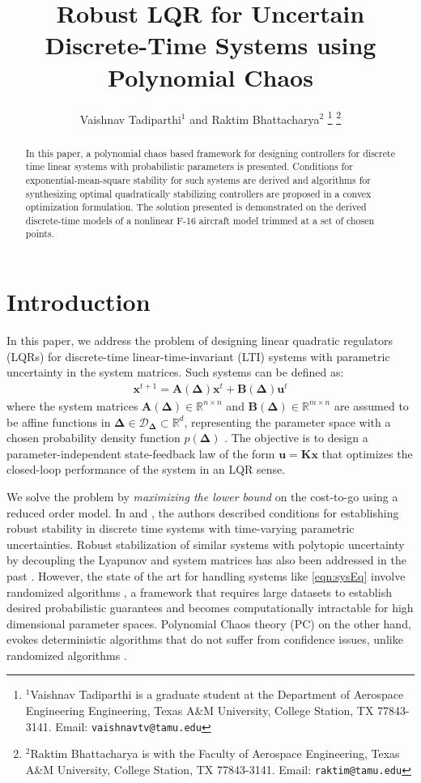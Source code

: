 \documentclass[letterpaper, 10 pt, conference]{ieeeconf}  %
\title{\LARGE \bf
Robust LQR for Uncertain Discrete-Time Systems using Polynomial Chaos
}
\author{Vaishnav Tadiparthi$^{1}$ and Raktim Bhattacharya$^{2}$%
\thanks{$^{1}$Vaishnav Tadiparthi is a graduate student at the Department of Aerospace Engineering Engineering, Texas A\&M University, College Station, TX 77843-3141. Email:
        {\tt\small vaishnavtv@tamu.edu}}%
\thanks{$^{2}$Raktim Bhattacharya is with the Faculty of Aerospace Engineering,  Texas A\&M University, College Station, TX 77843-3141. Email:
        {\tt\small raktim@tamu.edu}}%
}
\newcommand{\real}{\mathbb{R}}
\newcommand{\vo}[1]{\boldsymbol{#1}}
\newcommand{\Del}{\vo{\Delta}}
\begin{document}
\maketitle
\thispagestyle{empty}
\pagestyle{empty}


\begin{abstract}
   In this paper, a polynomial chaos based framework for designing controllers for discrete time linear systems with probabilistic parameters is presented. Conditions for exponential-mean-square stability for such systems are derived and algorithms for synthesizing optimal quadratically stabilizing controllers are proposed in a convex optimization formulation. The solution presented is demonstrated on the derived discrete-time models of a nonlinear F-16 aircraft model trimmed at a set of chosen points.
\end{abstract}


\section{Introduction}

In this paper, we address the problem of designing linear quadratic regulators (LQRs) for discrete-time linear-time-invariant (LTI) systems with parametric uncertainty in the system matrices. Such systems can be defined as:
\begin{align}
   \vo{x}^{t+1}  = \vo{A(\Delta)}\vo{x}^t + \vo{B(\Delta)}\vo{u}^t
   \label{eqn:sysEq}
\end{align}
where the system matrices $\vo{A(\Delta)} \in \real^{n \times n}$ and $\vo{B(\Delta)} \in \real^{m \times n}$ are assumed to be affine functions in $\vo{\Delta} \in \mathcal{D}_{\Del} \subset \real^d$, representing the parameter space with a chosen probability density function $p(\Del)$ \cite{barmish1997uniform}.
The objective is to design a parameter-independent state-feedback law of the form $\vo{u} = \vo{Kx}$ that optimizes the closed-loop performance of the system in an LQR sense.

We solve the problem by \textit{maximizing the lower bound}\cite{willems1971least} on the cost-to-go using a reduced order model.
In \cite{daafouz2001parameter} and \cite{de1999new}, the authors described conditions for establishing robust stability in discrete time systems with time-varying parametric uncertainties.  Robust stabilization of similar systems with polytopic uncertainty by decoupling the Lyapunov and system matrices has also been addressed in the past \cite{zhang2007improved}.
However, the state of the art for handling systems like \eqref{eqn:sysEq} involve randomized algorithms \cite{tempo2012randomized}, a framework that requires large datasets to establish desired probabilistic guarantees \cite{kim2013wiener} and becomes computationally intractable for high dimensional parameter spaces.
Polynomial Chaos theory (PC) on the other hand, evokes deterministic algorithms that do not suffer from confidence issues, unlike randomized algorithms \cite{bhattacharya2014robust}.
\end{document}
